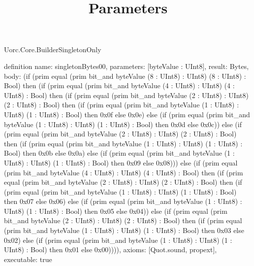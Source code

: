 \begin{lexlean}{Uorc.Core.BuilderSingletonOnly}
\title{Parameters}
\begin{semanticmodule}
definition{
  name: singletonBytes00,
  parameters: [byteValue : UInt8],
  result: Bytes,
  body: (if (prim equal (prim bit_and byteValue (8 : UInt8) : UInt8) (8 : UInt8) : Bool) then (if (prim equal (prim bit_and byteValue (4 : UInt8) : UInt8) (4 : UInt8) : Bool) then (if (prim equal (prim bit_and byteValue (2 : UInt8) : UInt8) (2 : UInt8) : Bool) then (if (prim equal (prim bit_and byteValue (1 : UInt8) : UInt8) (1 : UInt8) : Bool) then 0x0f else 0x0e) else (if (prim equal (prim bit_and byteValue (1 : UInt8) : UInt8) (1 : UInt8) : Bool) then 0x0d else 0x0c)) else (if (prim equal (prim bit_and byteValue (2 : UInt8) : UInt8) (2 : UInt8) : Bool) then (if (prim equal (prim bit_and byteValue (1 : UInt8) : UInt8) (1 : UInt8) : Bool) then 0x0b else 0x0a) else (if (prim equal (prim bit_and byteValue (1 : UInt8) : UInt8) (1 : UInt8) : Bool) then 0x09 else 0x08))) else (if (prim equal (prim bit_and byteValue (4 : UInt8) : UInt8) (4 : UInt8) : Bool) then (if (prim equal (prim bit_and byteValue (2 : UInt8) : UInt8) (2 : UInt8) : Bool) then (if (prim equal (prim bit_and byteValue (1 : UInt8) : UInt8) (1 : UInt8) : Bool) then 0x07 else 0x06) else (if (prim equal (prim bit_and byteValue (1 : UInt8) : UInt8) (1 : UInt8) : Bool) then 0x05 else 0x04)) else (if (prim equal (prim bit_and byteValue (2 : UInt8) : UInt8) (2 : UInt8) : Bool) then (if (prim equal (prim bit_and byteValue (1 : UInt8) : UInt8) (1 : UInt8) : Bool) then 0x03 else 0x02) else (if (prim equal (prim bit_and byteValue (1 : UInt8) : UInt8) (1 : UInt8) : Bool) then 0x01 else 0x00)))),
  axioms: [Quot.sound, propext],
  executable: true
}


\end{semanticmodule}
\end{lexlean}
